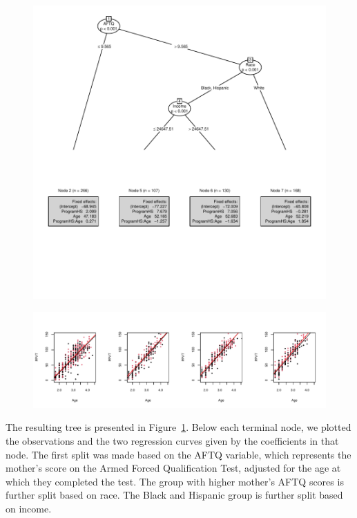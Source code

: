 \documentclass[doc,floatsintext,natbib]{apa7}
\begin{document}
\begin{figure}%
\caption{}
\includegraphics{MOB_paper-007}

\vspace*{-3cm}

\includegraphics{MOB_paper-008}
\label{fig:lmm_tree}
\end{figure}%

The resulting tree is presented in Figure~\ref{fig:lmm_tree}. Below each terminal node, we plotted the observations and the two regression curves given by the coefficients in that node. The first split was made based on the AFTQ variable, which represents the mother's score on the Armed Forced Qualification Test, adjusted for the age at which they completed the test. The group with higher mother's AFTQ scores is further split based on race. The Black and Hispanic group is further split based on income. 
\end{document}
